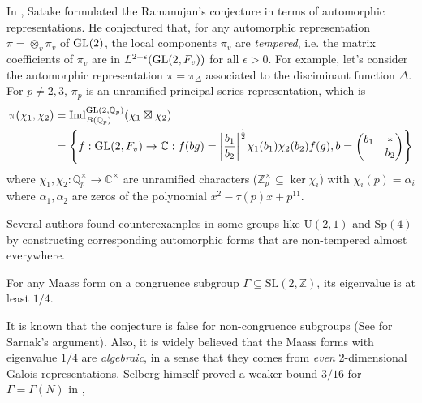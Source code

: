 In \cite{satake1966spherical}, Satake formulated the Ramanujan's conjecture
in terms of automorphic representations.
He conjectured that, for any automorphic representation $\pi = \otimes_{v}\pi_{v}$ of $\operatorname{\mathrm{GL}}(2)$,
the local components $\pi_{v}$ are \emph{tempered}, i.e. the matrix coefficients
of $\pi_{v}$ are in $L^{2+\epsilon}(\operatorname{\mathrm{GL}}(2, F_{v}))$ for all $\epsilon > 0$.
For example, let's consider the automorphic representation $\pi = \pi_{\Delta}$ associated
to the disciminant function $\Delta$.
For $p\neq 2, 3$, $\pi_{p}$ is an unramified principal series representation, which is 
\begin{align*}
\pi(\chi_{1}, \chi_{2}) &= \mathrm{Ind}_{B(\mathbb{Q}_{p})}^{\operatorname{\mathrm{GL}}(2, \mathbb{Q}_{p})}(\chi_{1}\boxtimes \chi_{2})\\ 
&= \left\{f: \operatorname{\mathrm{GL}}(2, F_{v})\to\mathbb{C}:f(bg) = \bigg|\frac{b_{1}}{b_{2}}\bigg|^{\frac{1}{2}}\chi_{1}(b_{1})\chi_{2}(b_{2})f(g),b = \begin{pmatrix}b_{1}&*\\&b_{2}\end{pmatrix}\right\}
\end{align*}
where $\chi_{1}, \chi_{2}: \mathbb{Q}_{p}^{\times}\to \mathbb{C}^{\times}$ are unramified characters ($\mathbb{Z}_{p}^{\times}\subseteq \ker\chi_{i}$)
with $\chi_{i}(p) = \alpha_{i}$ where $\alpha_{1}, \alpha_{2}$ are zeros of the polynomial $x^{2} - \tau(p)x + p^{11}$.


Several authors found counterexamples in some groups like $\mathrm{U}(2, 1)$ and $\mathrm{Sp}(4)$
by constructing corresponding automorphic forms that are non-tempered almost everywhere.


\begin{conjecture}
For any Maass form on a congruence subgroup $\Gamma \subseteq \mathrm{SL}(2, \mathbb{Z})$, its eigenvalue is at least $1/4$.
\end{conjecture}
It is known that the conjecture is false for non-congruence subgroups (See \cite{sarnak1995selberg} for Sarnak's argument). 
Also, it is widely believed that the Maass forms with eigenvalue $1/4$ are \emph{algebraic}, in a sense that they comes from \emph{even} 2-dimensional Galois representations.
Selberg himself proved a weaker bound $3/16$ for $\Gamma = \Gamma(N)$ in \cite{selberg1965estimation}, 

